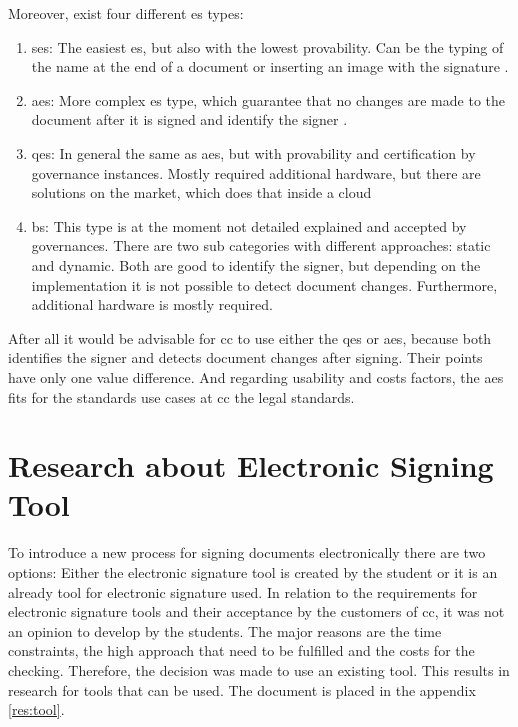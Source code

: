 Moreover, exist four different \gls{es} types:
\begin{enumerate}
	\item \Gls{ses}: The easiest \gls{es}, but also with the lowest provability. Can be the typing of the name at the end of a document or inserting an image with the signature \parencite{eIDAS2014,CEFd2018}.
	\item \Gls{aes}: More complex \gls{es} type, which guarantee that no changes are made to the document after it is signed and identify the signer \parencite{eIDAS2014}.
	\item \Gls{qes}: In general the same as \gls{aes}, but with provability and certification by governance instances. Mostly required additional hardware, but there are solutions on the market, which does that inside a cloud \parencite{eIDAS2014,CEFd2018} 
	\item \Gls{bs}: This type is at the moment not detailed explained and accepted by governances. There are two sub categories with different approaches: static and dynamic. Both are good to identify the signer, but depending on the implementation it is not possible to detect document changes. Furthermore, additional hardware is mostly required.
\end{enumerate}

After all it would be advisable for \gls{cc} to use either the \gls{qes} or \gls{aes}, because both identifies the signer and detects document changes after signing. Their points have only one value difference. And regarding usability and costs factors, the \gls{aes} fits for the standards use cases at \gls{cc} the legal standards.

\section{Research about Electronic Signing Tool}
To introduce a new process for signing documents electronically there are two options: Either the electronic signature tool is created by the student or it is an already tool for electronic signature used. In relation to the requirements for electronic signature tools and their acceptance by the customers of \gls{cc}, it was not an opinion to develop by the students. The major reasons are the time constraints, the high approach that need to be fulfilled and the costs for the checking. Therefore, the decision was made to use an existing tool. This results in research for tools that can be used. The document is placed in the appendix \ref{res:tool}. 


